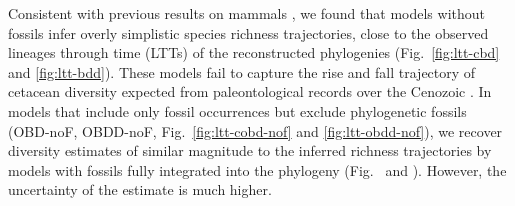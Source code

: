 \documentclass[oupdraft]{sysbio}
\begin{document}
Consistent with previous results on mammals \citep{quintero_imbalanced_2024}, we found that models without fossils infer overly simplistic species richness trajectories, close to the observed lineages through time (LTTs) of the reconstructed phylogenies (Fig.~\ref{fig:ltt-cbd} and \ref{fig:ltt-bdd}). These models fail to capture the rise and fall trajectory of cetacean diversity expected from paleontological records over the Cenozoic \citep{morlon_reconciling_2011, marx_baleen_2015, quintero_rise_2025}. In models that include only fossil occurrences but exclude phylogenetic fossils (OBD-noF, OBDD-noF, Fig.~\ref{fig:ltt-cobd-nof} and \ref{fig:ltt-obdd-nof}), we recover diversity estimates of similar magnitude to the inferred richness trajectories by models with fossils fully integrated into the phylogeny (Fig.~ and ). However, the uncertainty of the estimate is much higher.
\end{document}

